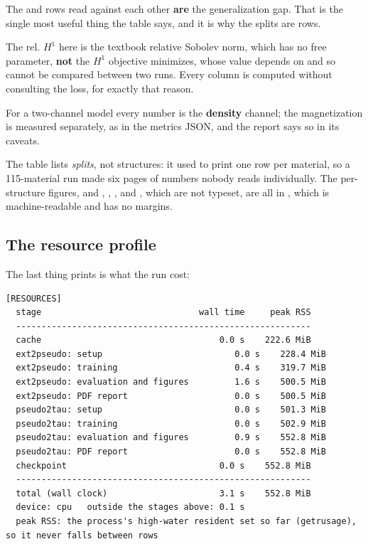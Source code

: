 The  and  rows read against each other \textbf{are} the generalization gap. That is the single most useful thing the table says, and it is why the splits are rows.

\begin{pnote}
The rel. $H^1$ here is the textbook relative Sobolev norm, which has no free parameter, \textbf{not} the $H^1$ objective  minimizes, whose value depends on  and so cannot be compared between two runs. Every column is computed without consulting the loss, for exactly that reason.

For a two-channel model every number is the \textbf{density} channel; the magnetization is measured separately, as  in the metrics JSON, and the report says so in its caveats.

The table lists \emph{splits}, not structures: it used to print one row per material, so a 115-material run made six pages of numbers nobody reads individually. The per-structure figures, and , , ,  and , which are not typeset, are all in , which is machine-readable and has no margins.
\end{pnote}

\subsection{The resource profile}

\label{sec:resource-profile}

The last thing  prints is what the run cost:

\begin{lstlisting}
[RESOURCES]
  stage                               wall time     peak RSS
  ----------------------------------------------------------
  cache                                   0.0 s    222.6 MiB
  ext2pseudo: setup                          0.0 s    228.4 MiB
  ext2pseudo: training                       0.4 s    319.7 MiB
  ext2pseudo: evaluation and figures         1.6 s    500.5 MiB
  ext2pseudo: PDF report                     0.0 s    500.5 MiB
  pseudo2tau: setup                          0.0 s    501.3 MiB
  pseudo2tau: training                       0.0 s    502.9 MiB
  pseudo2tau: evaluation and figures         0.9 s    552.8 MiB
  pseudo2tau: PDF report                     0.0 s    552.8 MiB
  checkpoint                              0.0 s    552.8 MiB
  ----------------------------------------------------------
  total (wall clock)                      3.1 s    552.8 MiB
  device: cpu   outside the stages above: 0.1 s
  peak RSS: the process's high-water resident set so far (getrusage), so it never falls between rows
\end{lstlisting}

